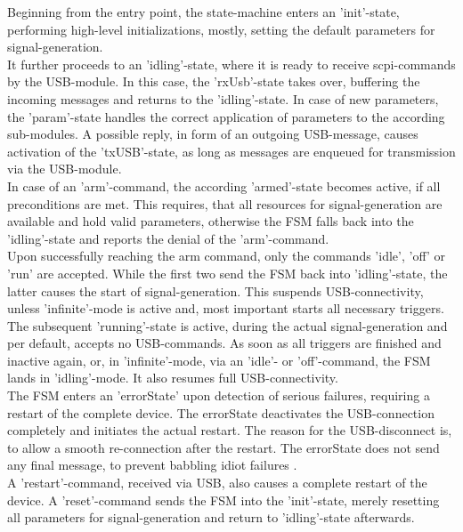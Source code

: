 \documentclass[master,english,smartquotes,apa]{hgbthesis}
\begin{document}
		Beginning from the entry point, the state-machine enters an 'init'-state, performing high-level initializations, mostly, setting the default parameters for signal-generation. \\
		
		It further proceeds to an 'idling'-state, where it is ready to receive scpi-commands by the USB-module. In this case, the 'rxUsb'-state takes over, buffering the incoming messages and returns to the 'idling'-state. In case of new parameters, the 'param'-state handles the correct application of parameters to the according sub-modules. A possible reply, in form of an outgoing USB-message, causes activation of the 'txUSB'-state, as long as messages are enqueued for transmission via the USB-module. \\
		
		In case of an 'arm'-command, the according 'armed'-state becomes active, if all preconditions are met. This requires, that all resources for signal-generation are available and hold valid parameters, otherwise the FSM falls back into the 'idling'-state and reports the denial of the 'arm'-command. \\
		
		Upon successfully reaching the arm command, only the commands 'idle', 'off' or 'run' are accepted. While the first two send the FSM back into 'idling'-state, the latter causes the start of signal-generation. This suspends USB-connectivity, unless 'infinite'-mode is active and, most important starts all necessary triggers. The subsequent 'running'-state is active, during the actual signal-generation and per default, accepts no USB-commands. As soon as all triggers are finished and inactive again, or, in 'infinite'-mode, via an 'idle'- or 'off'-command, the FSM lands in 'idling'-mode. It also resumes full USB-connectivity. \\
		
		The FSM enters an 'errorState' upon detection of serious failures, requiring a restart of the complete device. The errorState deactivates the USB-connection completely and initiates the actual restart. The reason for the USB-disconnect is, to allow a smooth re-connection after the restart. The errorState does not send any final message, to prevent babbling idiot failures \cite{Wang2009AvoidingTB}. \\
		
		A 'restart'-command, received via USB, also causes a complete restart of the device. A 'reset'-command sends the FSM into the 'init'-state, merely resetting all parameters for signal-generation and return to 'idling'-state afterwards. \\
		
\end{document}
